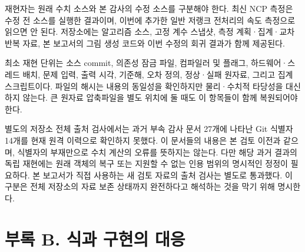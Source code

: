 \documentclass[
  10pt,
  a4paper,
]{article}
\begin{document}
재현자는 원래 수치 소스와 본 감사의 수정 소스를 구분해야 한다. 최신 NCP
측정은 수정 전 소스를 실행한 결과이며, 이번에 추가한 일반 저랭크
전처리의 속도 측정으로 읽으면 안 된다. 저장소에는 알고리즘 소스, 고정
계수 스냅샷, 측정 계획·집계·교차 반복 자료, 본 보고서의 그림 생성 코드와
이번 수정의 회귀 결과가 함께 제공된다.

최소 재현 단위는 소스 commit, 의존성 잠금 파일, 컴파일러 및 플래그,
하드웨어·스레드 배치, 문제 입력, 출력 시각, 기준해, 오차 정의, 정상·실패
원자료, 그리고 집계 스크립트이다. 파일의 해시는 내용의 동일성을
확인하지만 물리·수치적 타당성을 대신하지 않는다. 큰 원자료 압축파일을
별도 위치에 둘 때도 이 항목들이 함께 복원되어야 한다.

별도의 저장소 전체 출처 검사에서는 과거 부속 감사 문서 27개에 나타난 Git
식별자 14개를 현재 원격 이력으로 확인하지 못했다. 이 문서들의 내용은 본
검토 이전과 같으며, 식별자의 부재만으로 수치 계산의 오류를 뜻하지는
않는다. 다만 해당 과거 결과의 독립 재현에는 원래 객체의 복구 또는 지원할
수 없는 인용 범위의 명시적인 정정이 필요하다. 본 보고서가 직접 사용하는
새 검토 자료의 출처 검사는 별도로 통과했다. 이 구분은 전체 저장소의 자료
보존 상태까지 완전하다고 해석하는 것을 막기 위해 명시한다.

\hypertarget{uxbd80uxb85d-b.-uxc2dduxacfc-uxad6cuxd604uxc758-uxb300uxc751}{%
\section*{부록 B. 식과 구현의
대응}\label{uxbd80uxb85d-b.-uxc2dduxacfc-uxad6cuxd604uxc758-uxb300uxc751}}
\end{document}
